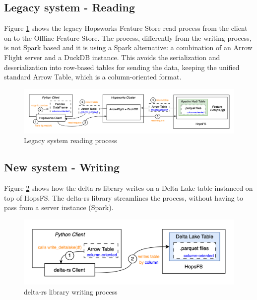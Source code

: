\subsection{Legacy system - Reading}
\label{subsec:legacy_sys_reading}

Figure \ref{fig:featurestore_reading} shows the legacy Hopsworks Feature Store read process from the client on to the Offline Feature Store. The process, differently from the writing process, is not Spark based and it is using a Spark alternative: a combination of an Arrow Flight server and a DuckDB instance. This avoids the serialization and deserialization into row-based tables for sending the data, keeping the unified standard Arrow Table, which is a column-oriented format.


\begin{figure}
    \begin{center}
      \includegraphics[width=\textwidth]{figures/2-background/FeatureStore-reading.png}
    \end{center}
    \caption{Legacy system reading process}
    \label{fig:featurestore_reading}
\end{figure}

\subsection{New system - Writing}

Figure \ref{fig:delta_rs_writing} shows how the delta-rs library writes on a Delta Lake table instanced on top of \gls{HopsFS}. The delta-rs library streamlines the process, without having to pass from a server instance (Spark).

\begin{figure}
    \begin{center}
      \includegraphics[width=\textwidth]{figures/2-background/delta-rs_writing.png}
    \end{center}
    \caption{delta-rs library writing process}
    \label{fig:delta_rs_writing}
\end{figure}

